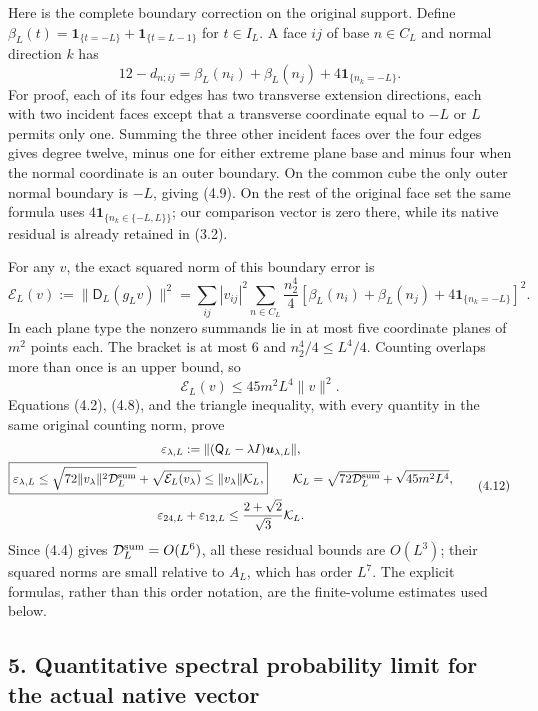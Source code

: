 \documentclass[
  11pt,
]{article}
\begin{document}
Here is the complete boundary correction on the original support. Define
\(\beta_L(t)=\mathbf1_{\{t=-L\}}+\mathbf1_{\{t=L-1\}}\) for
\(t\in I_L\). A face \(ij\) of base \(n\in C_L\) and normal direction
\(k\) has \[
12-d_{n;ij}=\beta_L(n_i)+\beta_L(n_j)+4\mathbf1_{\{n_k=-L\}}.
\tag{4.9}
\] For proof, each of its four edges has two transverse extension
directions, each with two incident faces except that a transverse
coordinate equal to \(-L\) or \(L\) permits only one. Summing the three
other incident faces over the four edges gives degree twelve, minus one
for either extreme plane base and minus four when the normal coordinate
is an outer boundary. On the common cube the only outer normal boundary
is \(-L\), giving (4.9). On the rest of the original face set the same
formula uses \(4\mathbf1_{\{n_k\in\{-L,L\}\}}\); our comparison vector
is zero there, while its native residual is already retained in (3.2).

For any \(v\), the exact squared norm of this boundary error is \[
\mathcal E_L(v):=\|\mathsf D_L(g_Lv)\|^2
 =\sum_{ij}|v_{ij}|^2\sum_{n\in C_L}\frac{n_2^4}{4}
  [\beta_L(n_i)+\beta_L(n_j)+4\mathbf1_{\{n_k=-L\}}]^2.
\tag{4.10}
\] In each plane type the nonzero summands lie in at most five
coordinate planes of \(m^2\) points each. The bracket is at most 6 and
\(n_2^4/4\le L^4/4\). Counting overlaps more than once is an upper
bound, so \[
\mathcal E_L(v)\le45m^2L^4\|v\|^2.
\tag{4.11}
\] Equations (4.2), (4.8), and the triangle inequality, with every
quantity in the same original counting norm, prove \[
\begin{gathered}
\varepsilon_{\lambda,L}
 :=\| (\mathsf Q_L-\lambda I)\boldsymbol u_{\lambda,L}\|,\\
\boxed{
\varepsilon_{\lambda,L}
 \le\sqrt{72\|v_\lambda\|^2\mathcal D_L^{\rm sum}}
          +\sqrt{\mathcal E_L(v_\lambda)}
 \le\|v_\lambda\|\mathcal K_L,}\qquad
\mathcal K_L=\sqrt{72\mathcal D_L^{\rm sum}}+\sqrt{45m^2L^4},\\
\varepsilon_{24,L}+\varepsilon_{12,L}
 \le\frac{2+\sqrt2}{\sqrt3}\mathcal K_L.
\end{gathered}
\tag{4.12}
\] Since (4.4) gives \(\mathcal D_L^{\rm sum}=O(L^6)\), all these
residual bounds are \(O(L^3)\); their squared norms are small relative
to \(A_L\), which has order \(L^7\). The explicit formulas, rather than
this order notation, are the finite-volume estimates used below.

\subsection{5. Quantitative spectral probability limit for the actual
native
vector}\label{magnetic-part-8-quantitative-spectral-probability-limit-for-the-actual-native-vector}
\end{document}

